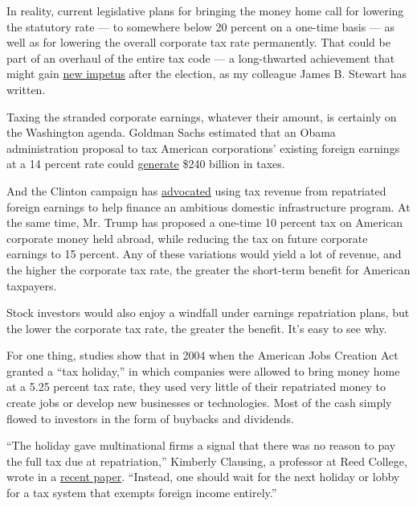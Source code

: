 In reality, current legislative plans for bringing the money home call
for lowering the statutory rate --- to somewhere below 20 percent on a
one-time basis --- as well as for lowering the overall corporate tax
rate permanently. That could be part of an overhaul of the entire tax
code --- a long-thwarted achievement that might gain
\href{http://www.nytimes.com/2016/11/04/business/a-rare-moment-of-unity-on-capitol-hill-thanks-to-trumps-taxes.html}{new
impetus} after the election, as my colleague James B. Stewart has
written.

Taxing the stranded corporate earnings, whatever their amount, is
certainly on the Washington agenda. Goldman Sachs estimated that an
Obama administration proposal to tax American corporations' existing
foreign earnings at a 14 percent rate could
\href{http://www.bloomberg.com/politics/articles/2016-10-25/clinton-readies-post-election-push-on-highways-corporate-taxes}{generate}
\$240 billion in taxes.

And the Clinton campaign has
\href{https://www.hillaryclinton.com/feed/hillary-clintons-275-billion-infrastructure-plan-game-changer-our-economy-heres-why/}{advocated}
using tax revenue from repatriated foreign earnings to help finance an
ambitious domestic infrastructure program. At the same time, Mr. Trump
has proposed a one-time 10 percent tax on American corporate money held
abroad, while reducing the tax on future corporate earnings to 15
percent. Any of these variations would yield a lot of revenue, and the
higher the corporate tax rate, the greater the short-term benefit for
American taxpayers.

Stock investors would also enjoy a windfall under earnings repatriation
plans, but the lower the corporate tax rate, the greater the benefit.
It's easy to see why.

For one thing, studies show that in 2004 when the American Jobs Creation
Act granted a ``tax holiday,'' in which companies were allowed to bring
money home at a 5.25 percent tax rate, they used very little of their
repatriated money to create jobs or develop new businesses or
technologies. Most of the cash simply flowed to investors in the form of
buybacks and dividends.

``The holiday gave multinational firms a signal that there was no reason
to pay the full tax due at repatriation,'' Kimberly Clausing, a
professor at Reed College, wrote in a
\href{http://equitablegrowth.org/report/profit-shifting-and-u-s-corporate-tax-policy-reform/}{recent
paper}. ``Instead, one should wait for the next holiday or lobby for a
tax system that exempts foreign income entirely.''

